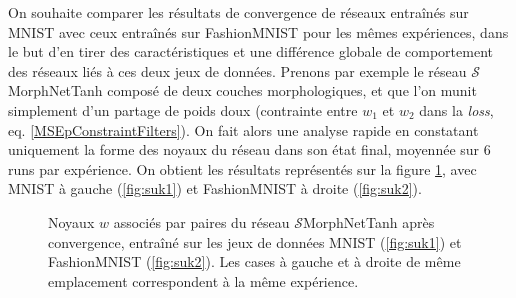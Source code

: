 On souhaite comparer les résultats de convergence de réseaux entraînés sur MNIST avec ceux entraînés sur FashionMNIST pour les mêmes expériences, dans le but d'en tirer des caractéristiques et une différence globale de comportement des réseaux liés à ces deux jeux de données. Prenons par exemple le réseau $\mathcal{S}$MorphNetTanh composé de deux couches morphologiques, et que l'on munit simplement d'un partage de poids doux (contrainte entre $w_1$ et $w_2$ dans la \textit{loss}, eq. \ref{MSEpConstraintFilters}). On fait alors une analyse rapide en constatant uniquement la forme des noyaux du réseau dans son état final, moyennée sur 6 runs par expérience. On obtient les résultats représentés sur la figure \ref{fig:results_mnist_vs_fashionmnist}, avec MNIST à gauche (\ref{fig:suk1}) et FashionMNIST à droite (\ref{fig:suk2}). \\

\vspace{0.2mm}
\begin{figure}[ht]
  \begin{center}
      \hspace{1.6mm}
    \caption{ \centering Noyaux $w$ associés par paires du réseau $\mathcal{S}$MorphNetTanh après convergence, entraîné sur les jeux de données MNIST (\ref{fig:suk1}) et FashionMNIST (\ref{fig:suk2}). Les cases à gauche et à droite de même emplacement correspondent à la même expérience.}
    \label{fig:results_mnist_vs_fashionmnist}
  \end{center}
\end{figure}

